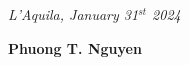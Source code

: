 \documentclass[a4paper,8pt]{article} %
\begin{document}
\begin{thebibliography}{100}
\emph{L'Aquila, January 31$^{st}$ 2024}


\textbf{Phuong T. Nguyen}
		
\end{thebibliography}
\end{document}
